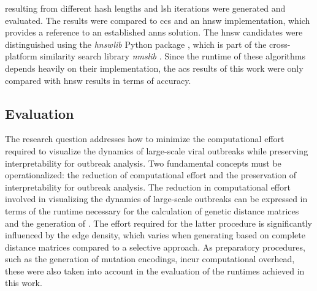  resulting from different hash lengths and \acrshort{lsh} iterations were generated and evaluated. The results were compared to \acrshort{ccs} and an \acrshort{hnsw} implementation, which provides a reference to an established \acrshort{anns} solution. The \acrshort{hnsw} candidates were distinguished using the \textit{hnswlib} Python package \cite{Hns1}, which is part of the cross-platform similarity search library \textit{nmslib} \cite{Nms1}. Since the runtime of these algorithms depends heavily on their implementation, the \acrshort{acs} results of this work were only compared with \acrshort{hnsw} results in terms of accuracy.

\subsection{Evaluation}
\label{sec:evaluation}
The research question addresses how to minimize the computational effort required to visualize the dynamics of large-scale viral outbreaks while preserving interpretability for outbreak analysis. Two fundamental concepts must be operationalized: the reduction of computational effort and the preservation of interpretability for outbreak analysis. The reduction in computational effort involved in visualizing the dynamics of large-scale outbreaks can be expressed in terms of the runtime necessary for the calculation of genetic distance matrices and the generation of . The effort required for the latter procedure is significantly influenced by the edge density, which varies when generating  based on complete distance matrices compared to a selective approach. As preparatory procedures, such as the generation of mutation encodings, incur computational overhead, these were also taken into account in the evaluation of the runtimes achieved in this work.


